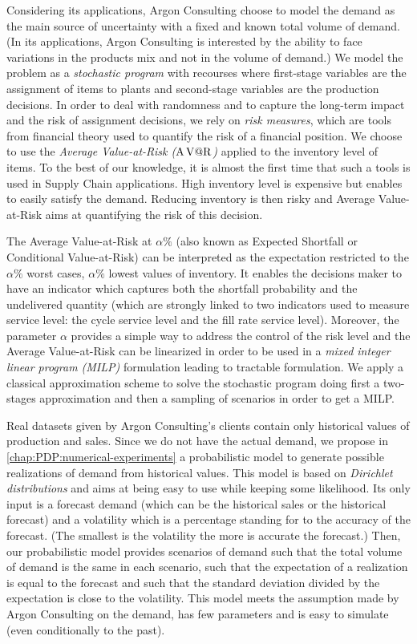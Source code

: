 Considering its applications, Argon Consulting choose to model the demand as the main source of uncertainty with a fixed and known total volume of demand.
(In its applications, Argon Consulting is interested by the ability to face variations in the products mix and not in the volume of demand.)
We model the problem as a \emph{stochastic program} with recourses where first-stage variables are the assignment of items to plants and second-stage variables are the production decisions.
In order to deal with randomness and to capture the long-term impact and the risk of assignment decisions, we rely on \emph{risk measures}, which are tools from financial theory used to quantify the risk of a financial position.
We choose to use the \emph{Average Value-at-Risk ($\operatorname{A\operatorname{V@R}}$)} applied to the inventory level of items.
To the best of our knowledge, it is almost the first time that such a tools is used in Supply Chain applications.
High inventory level is expensive but enables to easily satisfy the demand.
Reducing inventory is then risky and Average Value-at-Risk aims at quantifying the risk of this decision.


The Average Value-at-Risk at $\alpha\%$ (also known as Expected Shortfall or Conditional Value-at-Risk) can be interpreted as the expectation restricted to the $\alpha\%$ worst cases, \ie $\alpha\%$ lowest values of inventory.
It enables the decisions maker to have an indicator which captures both the shortfall probability and the undelivered quantity (which are strongly linked to two indicators used to measure service level: the cycle service level and the fill rate service level).
Moreover, the parameter $\alpha$ provides a simple way to address the control of the risk level and the Average Value-at-Risk can be linearized in order to be used in a \emph{mixed integer linear program (MILP)} formulation leading to tractable formulation.
We apply a classical approximation scheme to solve the stochastic program doing first a two-stages approximation and then a sampling of scenarios in order to get a MILP.


\medskip


Real datasets given by Argon Consulting's clients contain only historical values of production and sales.
Since we do not have the actual demand, we propose in \cref{chap:PDP:numerical-experiments} a probabilistic model to generate possible realizations of demand from historical values.
This model is based on \emph{Dirichlet distributions} and aims at being easy to use while keeping some likelihood.
Its only input is a forecast demand (which can be the historical sales or the historical forecast) and a volatility which is a percentage standing for to the accuracy of the forecast.
(The smallest is the volatility the more is accurate the forecast.)
Then, our probabilistic model provides scenarios of demand such that the total volume of demand is the same in each scenario, such that the expectation of a realization is equal to the forecast and such that the standard deviation divided by the expectation is close to the volatility.
This model meets the assumption made by Argon Consulting on the demand, has few parameters and is easy to simulate (even conditionally to the past).


